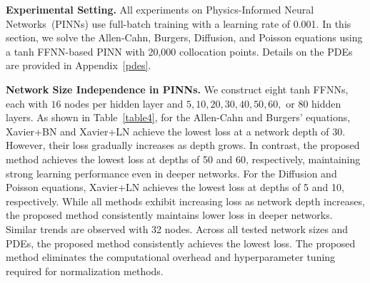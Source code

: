 \documentclass{article} \usepackage{iclr2025_conference,times}
\begin{document}
\textbf{Experimental Setting.} All experiments on Physics-Informed Neural Networks~(PINNs) use full-batch training with a learning rate of 0.001. In this section, we solve the Allen-Cahn, Burgers, Diffusion, and Poisson equations using a tanh FFNN-based PINN with 20,000 collocation points. Details on the PDEs are provided in Appendix~\ref{pdes}.




\textbf{Network Size Independence in PINNs.} 
We construct eight tanh FFNNs, each with $16$ nodes per hidden layer and $5, 10, 20, 30, 40, 50, 60,$ or $80$ hidden layers. As shown in Table~\ref{table4}, for the Allen-Cahn and Burgers' equations, Xavier+BN and Xavier+LN achieve the lowest loss at a network depth of 30. However, their loss gradually increases as depth grows. In contrast, the proposed method achieves the lowest loss at depths of 50 and 60, respectively, maintaining strong learning performance even in deeper networks. For the Diffusion and Poisson equations, Xavier+LN achieves the lowest loss at depths of 5 and 10, respectively. While all methods exhibit increasing loss as network depth increases, the proposed method consistently maintains lower loss in deeper networks. Similar trends are observed with 32 nodes. Across all tested network sizes and PDEs, the proposed method consistently achieves the lowest loss. The proposed method eliminates the computational overhead and hyperparameter tuning required for normalization methods.
\end{document}
